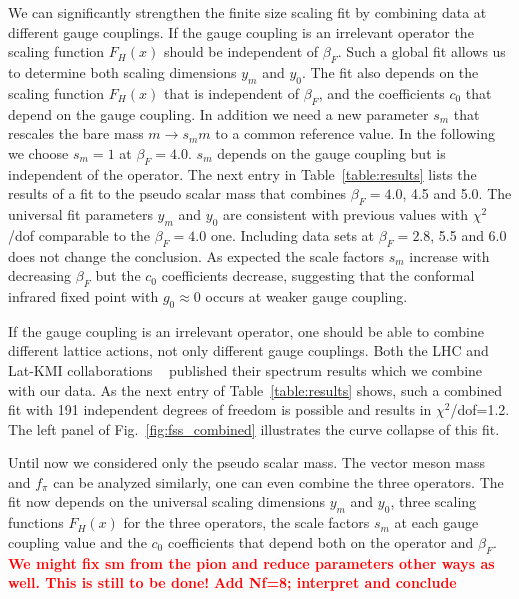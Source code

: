 \documentclass[aps,prl,twocolumn,]{revtex4}  %
\newcommand{\fig}[1]{Fig.~\ref{#1}}
\newcommand{\TODO}[1]{\textcolor{red}{{\bf #1}}}
\begin{document}
We can significantly strengthen  the finite size scaling fit   by combining data at different gauge couplings. If the gauge coupling is an irrelevant operator the scaling function $F_H(x)$ should be independent of $\beta_F$. Such a global fit allows us to determine both  scaling dimensions  $y_m$ and $y_0$. The fit also depends on the  scaling function $F_H(x)$ that is  independent of $\beta_F$, and the coefficients $c_0$ that depend on the gauge coupling. In addition we need a new parameter $s_m$ that rescales the bare mass $m \to s_m m$ to a common reference value. In the following we choose $s_m=1$ at $\beta_F=4.0$. $s_m$ depends on the gauge coupling but is independent of the operator. The next entry in Table~\ref{table:results} lists the results of a fit to the pseudo scalar mass that combines $\beta_F=4.0$, 4.5 and 5.0. The universal fit parameters $y_m$ and $y_0$ are consistent with previous values with $\chi^2$/dof  comparable to the   $\beta_F=4.0$ one. Including  data sets at $\beta_F=2.8$, 5.5 and 6.0 does not change the conclusion. As expected the  scale factors $s_m$ increase with decreasing $\beta_F$ but the $c_0$ coefficients decrease, suggesting that the conformal infrared fixed point with $g_0\approx 0$ occurs at weaker gauge coupling. 

If the gauge coupling is an irrelevant operator, one should be able to combine different lattice actions, not only different gauge couplings. Both the LHC and Lat-KMI collaborations ~\protect\cite{Fodor:2011tu,Aoki:2012eq} published their spectrum results which we combine with our data. As the  next entry of Table~\ref{table:results} shows, such a combined fit with 191 independent degrees of freedom is possible and results in $\chi^2$/dof=1.2.  The left panel of \fig{fig:fss_combined} illustrates the curve collapse of this fit. 

Until now we considered only the pseudo scalar mass. The vector meson mass and $f_\pi$ can be analyzed similarly, one can even combine the three operators. The fit now depends on the universal scaling dimensions  $y_m$ and $y_0$, three scaling functions $F_H(x)$ for the three operators, the scale factors $s_m$ at each gauge coupling value and the $c_0$ coefficients that depend both on the operator and $\beta_F$. 
\TODO{ We might fix sm from the pion and reduce parameters other ways as well. This is still to be done!} 
\TODO{Add Nf=8; interpret and conclude} 


\end{document}
